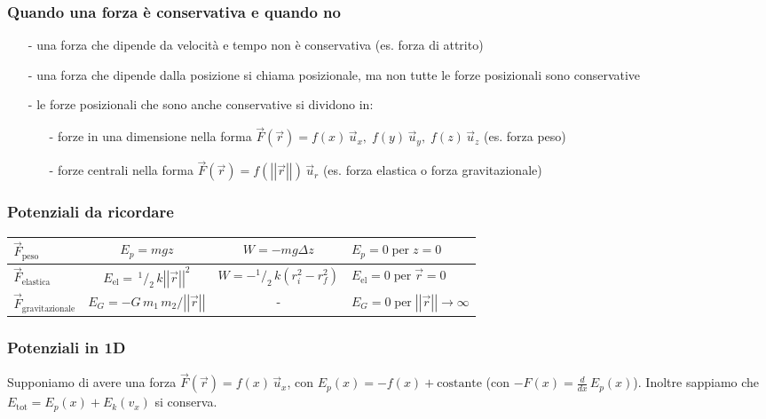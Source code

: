 \documentclass[a4paper]{article}
\newcommand\ux{\vec{u}_x}
\newcommand\uy{\vec{u}_y}
\newcommand\uz{\vec{u}_z}
\newcommand\ur{\vec{u}_r}
\newcommand\vmod[1]{\left|\left|{#1}\right|\right|}
\begin{document}
\subsubsection*{Quando una forza è conservativa e quando no}
\begin{itemize}[topsep=3pt, itemsep=0pt]
	\item[-] una forza che dipende da velocità e tempo non è conservativa (es. forza di attrito)
	\item[-] una forza che dipende dalla posizione si chiama posizionale, ma non tutte le forze posizionali sono conservative
	\item[-] le forze posizionali che sono anche conservative si dividono in:
	\begin{itemize}[topsep=3pt, itemsep=0pt]
		\item[-] forze in una dimensione nella forma \(\vec{F}(\vec{r}) = f(x)\,\ux, \; f(y)\,\uy, \; f(z)\,\uz\) (es. forza peso)
		\item[-] forze centrali nella forma \(\vec{F}(\vec{r}) = f(\vmod{\vec{r}}) \, \ur\) (es. forza elastica o forza gravitazionale)
	\end{itemize}
\end{itemize}

\subsubsection*{Potenziali da ricordare}
\begin{center}
	\begin{tabular}{l | c | c | l}
		\(\vec{F}_\text{peso}\) & \(E_p = mgz\) & \(W = - mg \Delta z\) &  \(E_p = 0 \; \text{per} \; z = 0\) \\
		\midrule
		\(\vec{F}_\text{elastica}\) & \(E_\text{el} = \,^1\!/_2 \, k \vmod{\vec{r}}^2\) & \(W = -^1\!/_2 \, k(r_i^2 - r_f^2)\) & \(E_\text{el} = 0 \; \text{per} \; \vec{r} = 0\) \\
		\midrule
		\(\vec{F}_\text{gravitazionale}\) & \(E_G = -G \, m_1 \, m_2 / \vmod{\vec{r}}\) & - & \(E_G = 0 \; \text{per} \; \vmod{\vec{r}} \to \infty\)
	\end{tabular}
	
\end{center}
\newpage

\subsubsection*{Potenziali in 1D}
Supponiamo di avere una forza \(\vec{F}(\vec{r}) = f(x) \, \ux\), con \(E_p(x) = -f(x) + \text{costante}\) (con \(-F(x) = \frac{d}{dx}\,E_p(x)\)).
Inoltre sappiamo che \(E_\text{tot} = E_p(x) + E_k(v_x)\) si conserva.
\end{document}
